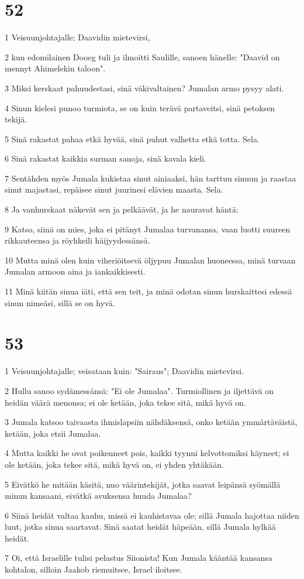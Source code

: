 \chapter{52}

\par 1 Veisuunjohtajalle; Daavidin mietevirsi,
\par 2 kun edomilainen Dooeg tuli ja ilmoitti Saulille, sanoen hänelle: "Daavid on mennyt Ahimelekin taloon".
\par 3 Miksi kerskaat pahuudestasi, sinä väkivaltainen? Jumalan armo pysyy alati.
\par 4 Sinun kielesi punoo turmiota, se on kuin terävä partaveitsi, sinä petoksen tekijä.
\par 5 Sinä rakastat pahaa etkä hyvää, sinä puhut valhetta etkä totta. Sela.
\par 6 Sinä rakastat kaikkia surman sanoja, sinä kavala kieli.
\par 7 Sentähden myös Jumala kukistaa sinut ainiaaksi, hän tarttuu sinuun ja raastaa sinut majastasi, repäisee sinut juurinesi elävien maasta. Sela.
\par 8 Ja vanhurskaat näkevät sen ja pelkäävät, ja he nauravat häntä:
\par 9 Katso, siinä on mies, joka ei pitänyt Jumalaa turvanansa, vaan luotti suureen rikkauteensa ja röyhkeili häijyydessänsä.
\par 10 Mutta minä olen kuin viheriöitsevä öljypuu Jumalan huoneessa, minä turvaan Jumalan armoon aina ja iankaikkisesti.
\par 11 Minä kiitän sinua iäti, että sen teit, ja minä odotan sinun hurskaittesi edessä sinun nimeäsi, sillä se on hyvä.

\chapter{53}

\par 1 Veisuunjohtajalle; veisataan kuin: "Sairaus"; Daavidin mietevirsi.
\par 2 Hullu sanoo sydämessänsä: "Ei ole Jumalaa". Turmiollinen ja iljettävä on heidän väärä menonsa; ei ole ketään, joka tekee sitä, mikä hyvä on.
\par 3 Jumala katsoo taivaasta ihmislapsiin nähdäksensä, onko ketään ymmärtäväistä, ketään, joka etsii Jumalaa.
\par 4 Mutta kaikki he ovat poikenneet pois, kaikki tyynni kelvottomiksi käyneet; ei ole ketään, joka tekee sitä, mikä hyvä on, ei yhden yhtäkään.
\par 5 Eivätkö he mitään käsitä, nuo väärintekijät, jotka saavat leipänsä syömällä minun kansaani, eivätkä avuksensa huuda Jumalaa?
\par 6 Siinä heidät valtaa kauhu, missä ei kauhistavaa ole; sillä Jumala hajottaa niiden luut, jotka sinua saartavat. Sinä saatat heidät häpeään, sillä Jumala hylkää heidät.
\par 7 Oi, että Israelille tulisi pelastus Siionista! Kun Jumala kääntää kansansa kohtalon, silloin Jaakob riemuitsee, Israel iloitsee.

